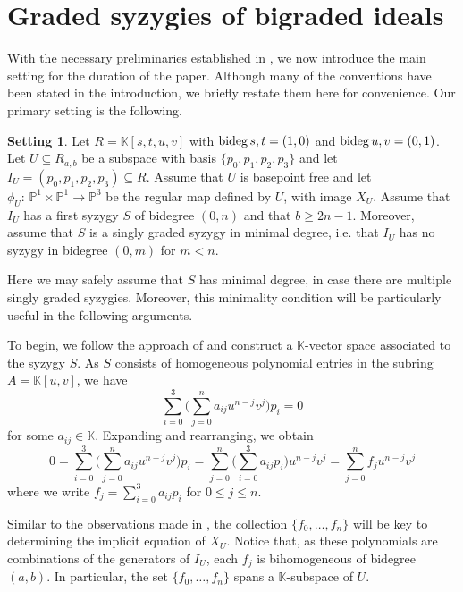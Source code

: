 \documentclass[reqno]{amsart}
\numberwithin{equation}{section}
\theoremstyle{definition}
\newtheorem{set}[thm]{Setting}
\def\K{\mathbb{K}}
\def\P{\mathbb{P}}
\def\bideg{\mathop{\rm bideg}}
\begin{document}
\section{Graded syzygies of bigraded ideals}\label{Graded Syz Section}

With the necessary preliminaries established in , we now introduce the main setting for the duration of the paper. Although many of the conventions have been stated in the introduction, we briefly restate them here for convenience. Our primary setting is the following.




\begin{set}\label{General Setting}
Let $R=\K[s,t,u,v]$ with $\bideg s,t =(1,0)$ and $\bideg u,v = (0,1)$. Let $U \subseteq R_{a,b}$ be a subspace with basis $\{p_0,p_1,p_2,p_3\}$ and let $I_U = (p_0,p_1,p_2,p_3) \subseteq R$. Assume that $U$ is basepoint free and let $\phi_U:\, \P^1\times \P^1 \longrightarrow \P^3$ be the regular map defined by $U$, with image $X_U$. Assume that $I_U$ has a first syzygy $S$ of bidegree $(0,n)$ and that $b\geq 2n-1$. Moreover, assume that $S$ is a singly graded syzygy in minimal degree, i.e. that $I_U$ has no syzygy in bidegree $(0,m)$ for $m<n$.
\end{set}

Here we may safely assume that $S$ has minimal degree, in case there are multiple singly graded syzygies. Moreover, this minimality condition will be particularly useful in the following arguments.

To begin, we follow the approach of \cite{Weaver25} and construct a $\K$-vector space associated to the syzygy $S$. As $S$ consists of homogeneous polynomial entries in the subring $A=\K[u,v]$, we have
$$\sum_{i=0}^3 \big(\sum_{j=0}^n a_{ij} u^{n-j}v^j\big) p_i =0$$
for some $a_{ij}\in \K$. Expanding and rearranging, we obtain
\begin{equation}\label{Syzygy rearrangement}
    0=\sum_{i=0}^3 \big(\sum_{j=0}^n a_{ij} u^{n-j}v^j\big) p_i = \sum_{j=0}^n \big( \sum_{i=0}^3 a_{ij} p_i\big) u^{n-j}v^j= \sum_{j=0}^n f_j u^{n-j}v^j
\end{equation}
where we write $f_j = \sum_{i=0}^3 a_{ij} p_i$ for $0\leq j\leq n$. 


Similar to the observations made in \cite{Weaver25}, the collection $\{f_0,\ldots,f_n\}$ will be key to determining the implicit equation of $X_U$. Notice that, as these polynomials are combinations of the generators of $I_U$, each $f_j$ is bihomogeneous of bidegree $(a,b)$. In particular, the set $\{f_0,\ldots,f_n\}$ spans a $\K$-subspace of $U$. 
\end{document}

